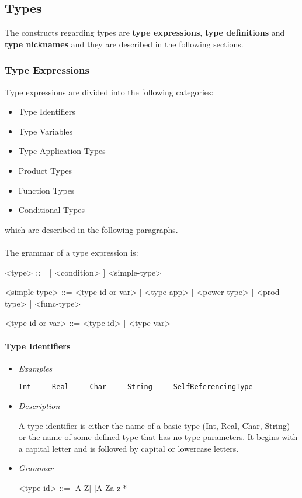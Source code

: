 \documentclass{article}
\begin{document}
\subsection{Types}
\label{subsec:types}

The constructs regarding types are \textbf{type expressions}, \textbf{type
definitions} and \textbf{type nicknames} and they are described in the
following sections.

\subsubsection{Type Expressions}

Type expressions are divided into the following categories:
\begin{itemize}
\item Type Identifiers
\item Type Variables
\item Type Application Types
\item Product Types
\item Function Types
\item Conditional Types
\end{itemize}
which are described in the following paragraphs.
\\\\
The grammar of a type expression is:
\begin{grammar}
<type> ::= [ <condition> ]  <simple-type> 

<simple-type> ::=
<type-id-or-var> | <type-app> | <power-type> | <prod-type> | <func-type>

<type-id-or-var> ::= <type-id> | <type-var>
\end{grammar}

\paragraph{Type Identifiers}

\begin{itemize}
\item \textit{Examples}
\begin{verbatim}
Int     Real     Char     String     SelfReferencingType
\end{verbatim}

\item \textit{Description}

A type identifier is either the name of a basic type (Int, Real, Char, String)
or the name of some defined type that has no type parameters. It begins with a
capital letter and is followed by capital or lowercase letters.

\item \textit{Grammar}
\begin{grammar}
<type-id> ::= [A-Z] [A-Za-z]*
\end{grammar}
\end{itemize}
\end{document}
